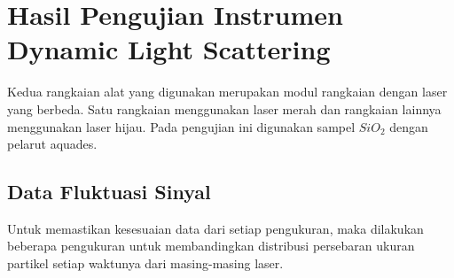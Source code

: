 \section{Hasil Pengujian Instrumen Dynamic Light Scattering}
Kedua rangkaian alat yang digunakan merupakan modul rangkaian
dengan laser yang berbeda. Satu rangkaian menggunakan laser
merah dan rangkaian lainnya menggunakan laser hijau. Pada
pengujian ini digunakan sampel ${SiO_2}$ dengan pelarut aquades.

\subsection{Data Fluktuasi Sinyal}
Untuk memastikan kesesuaian data dari setiap pengukuran, maka
dilakukan beberapa pengukuran untuk membandingkan distribusi
persebaran ukuran partikel setiap waktunya dari masing-masing
laser.

